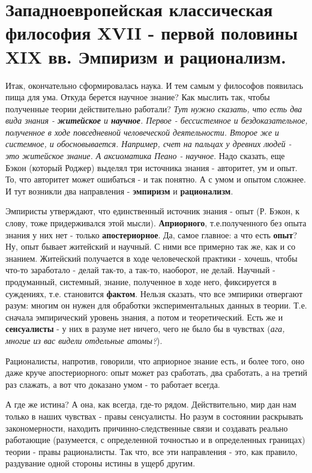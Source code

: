 \section{Западноевропейская классическая философия XVII - первой половины XIX вв. Эмпиризм и рационализм.}
Итак, окончательно сформировалась наука. И тем самым у философов появилась пища для ума. Откуда берется научное знание? Как мыслить так, чтобы полученные теории действительно работали? \textit{Тут нужно сказать, что есть два вида знания - \textbf{житейское} и \textbf{научное}. Первое - бессистемное и бездоказательное, полученное в ходе повседневной человеческой деятельности. Второе же и системное, и обосновывается. Например, счет на пальцах у древних людей - это житейское знание. А аксиоматика Пеано - научное}. Надо сказать, еще Бэкон (который Роджер) выделял три источника знания - авторитет, ум и опыт. То, что авторитет может ошибаться - и так понятно. А с умом и опытом сложнее. И тут возникли два направления - \textbf{эмпиризм} и \textbf{рационализм}.

Эмпиристы утверждают, что единственный источник знания - опыт (Р. Бэкон, к слову, тоже придерживался этой мысли). \textbf{Априорного}, т.е.полученного без опыта знания у них нет - только  \textbf{апостериорное}. Да, самое главное: а что есть \textbf{опыт}? Ну, опыт бывает житейский и научный. С ними все примерно так же, как и со знанием. Житейский получается в ходе человеческой практики - хочешь, чтобы что-то заработало - делай так-то, а так-то, наоборот, не делай. Научный - продуманный, системный, знание, полученное в ходе него, фиксируется в суждениях, т.е. становится \textbf{фактом}. Нельзя сказать, что все эмпирики отвергают разум: многим он нужен для обработки экспериментальных данных в теории. Т.е. сначала эмпирический уровень знания, а потом и теоретический. Есть же и \textbf{сенсуалисты} - у них в разуме нет ничего, чего не было бы в чувствах (\textit{ага, многие из вас видели отдельные атомы?}).

Рационалисты, напротив, говорили, что априорное знание есть, и более того, оно даже круче апостериорного: опыт может раз сработать, два сработать, а на третий раз слажать, а вот что доказано умом - то работает всегда.

А где же истина? А она, как всегда, где-то рядом. Действительно, мир дан нам только в наших чувствах - правы сенсуалисты. Но разум в состоянии раскрывать закономерности, находить причинно-следственные связи и создавать реально работающие (разумеется, с определенной точностью и в определенных границах) теории - правы рационалисты. Так что, все эти направления - это, как правило, раздувание одной стороны истины в ущерб другим.

